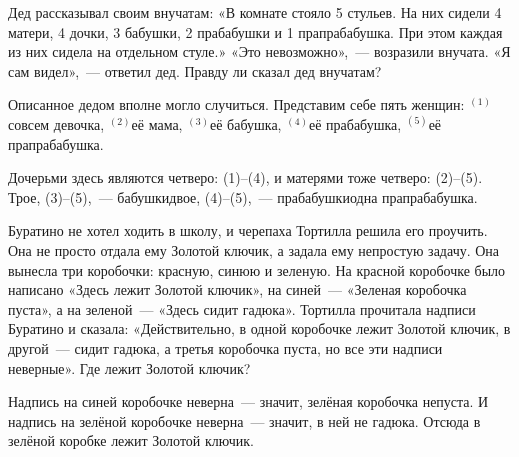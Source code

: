 \begin{itemize}

\itA Дед рассказывал своим внучатам: «В комнате стояло 5 стульев. На них сидели 4 матери, 4 дочки, 3 бабушки, 2 прабабушки и 1 прапрабабушка. При этом каждая из них сидела на отдельном стуле.» «Это невозможно»,~— возразили внучата. «Я сам видел»,~— ответил дед. Правду ли сказал дед внучатам?

\def\upno#1{$ ^{(\text{#1})}$}
\itr Описанное дедом вполне могло случиться. Представим себе пять женщин: \upno{1}совсем девочка, \upno{2}её мама, \upno{3}её бабушка, \upno{4}её прабабушка, \upno{5}её прапрабабушка.

Дочерьми здесь являются четверо: (1)–(4), и матерями тоже четверо: (2)–(5). Трое, (3)–(5),~— бабушки\scolon двое, (4)–(5),~— прабабушки\scolon одна прапрабабушка.

\itC Буратино не хотел ходить в школу, и черепаха Тортилла решила его проучить. Она не просто отдала ему Золотой ключик, а задала ему непростую задачу. Она вынесла три коробочки: красную, синюю и зеленую. На красной коробочке было написано «Здесь лежит Золотой ключик», на синей~— «Зеленая коробочка пуста», а на зеленой~— «Здесь сидит гадюка». Тортилла прочитала надписи Буратино и сказала: «Действительно, в одной коробочке лежит Золотой ключик, в другой~— сидит гадюка, а третья коробочка пуста, но все эти надписи неверные». Где лежит Золотой ключик?

\itr Надпись на синей коробочке неверна~— значит, зелёная коробочка непуста. И надпись на зелёной коробочке неверна~— значит, в ней не гадюка. Отсюда в зелёной коробке лежит Золотой ключик.

\end{itemize}